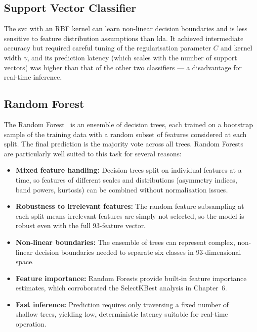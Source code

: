\subsection{Support Vector Classifier}

The \acrshort{svc} with an RBF kernel can learn non-linear decision
boundaries and is less sensitive to feature distribution assumptions
than \acrshort{lda}. It achieved intermediate accuracy but required
careful tuning of the regularisation parameter $C$ and kernel
width $\gamma$, and its prediction latency (which scales with the
number of support vectors) was higher than that of the other two
classifiers — a disadvantage for real-time inference.

\subsection{Random Forest}

The Random Forest~\cite{breiman2001rf} is an ensemble of decision
trees, each trained on a bootstrap sample of the training data with
a random subset of features considered at each split. The final
prediction is the majority vote across all trees. Random Forests
are particularly well suited to this task for several reasons:

\begin{itemize}[leftmargin=*]
    \item \textbf{Mixed feature handling:} Decision trees split on
    individual features at a time, so features of different scales
    and distributions (asymmetry indices, band powers, kurtosis)
    can be combined without normalisation issues.
    \item \textbf{Robustness to irrelevant features:} The random
    feature subsampling at each split means irrelevant features are
    simply not selected, so the model is robust even with the full
    93-feature vector.
    \item \textbf{Non-linear boundaries:} The ensemble of trees can
    represent complex, non-linear decision boundaries needed to
    separate six classes in 93-dimensional space.
    \item \textbf{Feature importance:} Random Forests provide
    built-in feature importance estimates, which corroborated the
    SelectKBest analysis in Chapter~6.
    \item \textbf{Fast inference:} Prediction requires only
    traversing a fixed number of shallow trees, yielding low,
    deterministic latency suitable for real-time operation.
\end{itemize}

